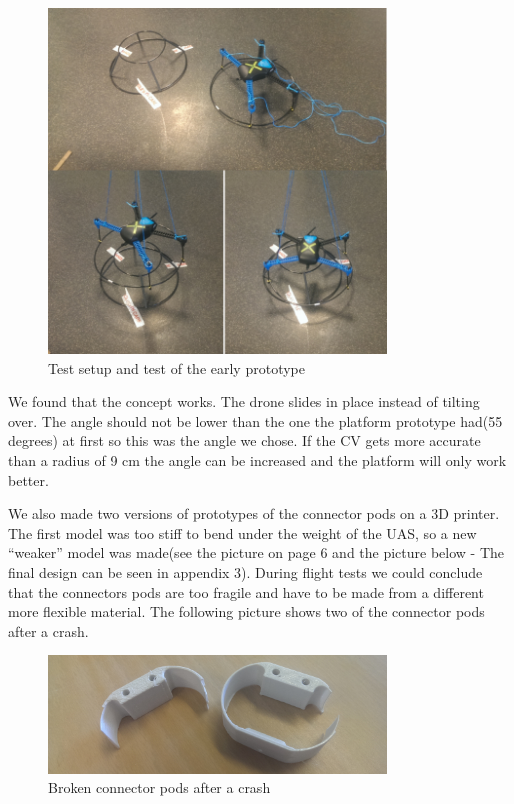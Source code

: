 \begin{figure}
	\centering
	\includegraphics[width=0.8\textwidth]{imgs/prototype1_test}
	\caption{Test setup and test of the early prototype}
\end{figure}

We found that the concept works. The drone slides in place instead of tilting over. The angle should not be lower than the one the platform prototype had(55 degrees) at first so this was the angle we chose. If the CV gets more accurate than a radius of 9 cm the angle can be increased and the platform will only work better.

We also made two versions of prototypes of the connector pods on a 3D printer. The first model was too stiff to bend under the weight of the UAS, so a new “weaker” model was made(see the picture on page 6 and the picture below - The final design can be seen in appendix 3). During flight tests we could conclude that the connectors pods are too fragile and have to be made from a different more flexible material. The following picture shows two of the connector pods after a crash.

\begin{figure}
	\centering
	\includegraphics[width=0.8\textwidth]{imgs/connectorpod_crashed}
	\caption{Broken connector pods after a crash}
\end{figure}

